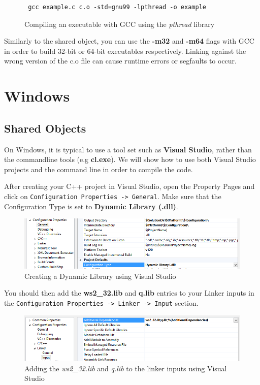  \begin{figure}[h]
 \begin{lstlisting}
 gcc example.c c.o -std=gnu99 -lpthread -o example
 \end{lstlisting}
 \caption{Compiling an executable with GCC using the \textit{pthread} library}
 \end{figure}
 
 Similarly to the shared object, you can use the \textbf{-m32} and \textbf{-m64} flags with GCC in order to
 build 32-bit or 64-bit executables respectively. Linking against the wrong version of the c.o file can cause
 runtime errors or segfaults to occur. 
 
 \section{Windows}
 
 \subsection{Shared Objects}
 
 On Windows, it is typical to use a tool set such as \textbf{Visual Studio}, rather than the commandline tools (e.g \textbf{cl.exe}). We will show how to use both Visual Studio projects and the command line in order to compile the code.
 
 After creating your C++ project in Visual Studio, open the Property Pages and click on \verb|Configuration Properties -> General|. Make sure that the Configuration Type is set to \textbf{Dynamic Library (.dll)}.

  \begin{figure}[H]
  	\centering
  	\includegraphics[scale=0.50]{figures/vsdynamiclibrary.png}
  	\caption{Creating a Dynamic Library using Visual Studio}
  	\label{vsdynamiclibrary}
  \end{figure}

 You should then add the \textbf{ws2\_32.lib} and \textbf{q.lib} entries to your Linker inputs in the \verb|Configuration Properties -> Linker -> Input| section.  

	\begin{figure}[H]
		\centering
		\includegraphics[scale=0.50]{figures/vsdynamiclinker.png}
		\caption{Adding the \textit{ws2\_32.lib} and \textit{q.lib} to the linker inputs using Visual Studio}
		\label{vsdynamiclinker}
	\end{figure}
 
